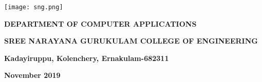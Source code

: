 \documentclass[a4paper, 12pt]{report}
\begin{document}
\begin{titlepage}
\texttt{[image: sng.png]}\par\vspace{0.4cm}
	{\bfseries\fontsize{16pt}{16pt}\selectfont DEPARTMENT OF COMPUTER APPLICATIONS\par}
	{\bfseries\fontsize{14pt}{14pt}\selectfont SREE NARAYANA GURUKULAM COLLEGE OF ENGINEERING\par}
	\vspace{0.1cm}
	{\bfseries\fontsize{16pt}{16pt}\selectfont Kadayiruppu, Kolenchery, Ernakulam-682311 \par}
	\vspace{0.1cm}
	{\bfseries\fontsize{16pt}{16pt}\selectfont  November 2019 \par}
\end{titlepage}

\end{document}

